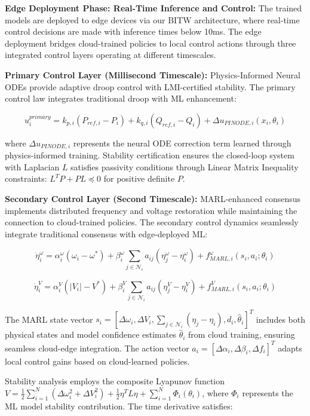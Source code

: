 \documentclass[12pt]{article}
\begin{document}
\textbf{Edge Deployment Phase: Real-Time Inference and Control:} The trained models are deployed to edge devices via our BITW architecture, where real-time control decisions are made with inference times below 10ms. The edge deployment bridges cloud-trained policies to local control actions through three integrated control layers operating at different timescales.

\textbf{Primary Control Layer (Millisecond Timescale):} Physics-Informed Neural ODEs provide adaptive droop control with LMI-certified stability. The primary control law integrates traditional droop with ML enhancement:

$$u_i^{primary} = k_{p,i}(P_{ref,i} - P_i) + k_{q,i}(Q_{ref,i} - Q_i) + \Delta u_{PINODE,i}(x_i, \theta_i)$$

where $\Delta u_{PINODE,i}$ represents the neural ODE correction term learned through physics-informed training. Stability certification ensures the closed-loop system with Laplacian $L$ satisfies passivity conditions through Linear Matrix Inequality constraints: $L^T P + PL \preceq 0$ for positive definite $P$.

\textbf{Secondary Control Layer (Second Timescale):} MARL-enhanced consensus implements distributed frequency and voltage restoration while maintaining the connection to cloud-trained policies. The secondary control dynamics seamlessly integrate traditional consensus with edge-deployed ML:

$$\dot{\eta}_i^{\omega} = \alpha_i^{\omega}(\omega_i - \omega^*) + \beta_i^{\omega} \sum_{j \in \mathcal{N}_i} a_{ij}(\eta_j^{\omega} - \eta_i^{\omega}) + f_{MARL,i}^{\omega}(s_i, a_i; \theta_i)$$

$$\dot{\eta}_i^{V} = \alpha_i^{V}(|V_i| - V^*) + \beta_i^{V} \sum_{j \in \mathcal{N}_i} a_{ij}(\eta_j^{V} - \eta_i^{V}) + f_{MARL,i}^{V}(s_i, a_i; \theta_i)$$

The MARL state vector $s_i = [\Delta\omega_i, \Delta V_i, \sum_{j \in \mathcal{N}_i}(\eta_j - \eta_i), d_i, \hat{\theta}_i]^T$ includes both physical states and model confidence estimates $\hat{\theta}_i$ from cloud training, ensuring seamless cloud-edge integration. The action vector $a_i = [\Delta\alpha_i, \Delta\beta_i, \Delta f_i]^T$ adapts local control gains based on cloud-learned policies.

Stability analysis employs the composite Lyapunov function $V = \frac{1}{2}\sum_{i=1}^N (\Delta\omega_i^2 + \Delta V_i^2) + \frac{1}{2}\eta^T L \eta + \sum_{i=1}^N \Phi_i(\theta_i)$, where $\Phi_i$ represents the ML model stability contribution. The time derivative satisfies:
\end{document}
